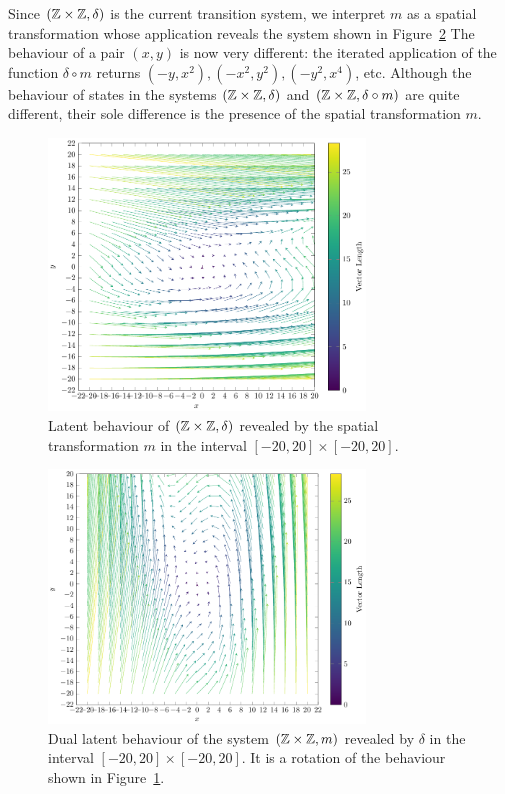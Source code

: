 Since $(\mathbb{Z}\times\mathbb{Z}, \delta)$ is the current transition system, we interpret $m$ as a spatial transformation whose application reveals the system shown in Figure~\ref{fig:SecondLatent}%
The behaviour of a pair $(x,y)$ is now very different: the iterated application of the function $\delta\circ m$ returns $(-y,x^2),(-x^2,y^2),(-y^2,x^4)$, etc. Although the behaviour of states in the systems $(\mathbb{Z}\times\mathbb{Z}, \delta)$ and $(\mathbb{Z}\times\mathbb{Z}, \delta\circ m)$ are quite different, their sole difference is the presence of the spatial transformation $m$. 
\begin{figure}[!t]
  \centering
  \includegraphics[width=0.75\textwidth]{Figures/VectorSpace4.pdf} 
  \caption{Latent behaviour of $(\mathbb{Z}\times\mathbb{Z}, \delta)$ revealed by the spatial transformation $m$ in the interval $[-20,20]\times[-20,20]$.}
  \label{fig:FirstLatent}
\end{figure} 
\begin{figure}[!t]
  \centering
  \includegraphics[width=0.75\textwidth]{Figures/VectorSpace3.pdf} 
  \caption{Dual latent behaviour of the system $(\mathbb{Z}\times\mathbb{Z}, m)$ revealed by $\delta$ in the interval $[-20,20]\times[-20,20]$. It is a rotation of the behaviour shown in Figure~\ref{fig:FirstLatent}.}
  \label{fig:SecondLatent} 
\end{figure}

